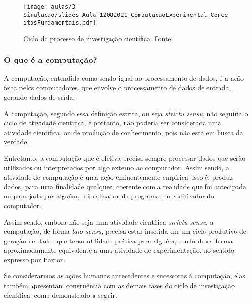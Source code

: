 \begin{figure}
    \centering
    \texttt{[image: aulas/3-Simulacao/slides\_Aula\_12082021\_ComputacaoExperimental\_ConceitosFundamentais.pdf]}
    \caption{Ciclo do processo de investigação científica. Fonte: \cite{barton_graphical_1999}\label{fig:ciclo:barton}}
\end{figure}

\subsubsection{O que é a computação?}
A computação, entendida como sendo igual ao processamento de dados, é a ação feita pelos computadores, que envolve o processamento de dados de entrada, gerando dados de saída.

A computação, segundo essa definição estrita, ou seja \textit{strictu sensu}, não seguiria o ciclo de atividade científica, e portanto, não poderia ser considerada uma atividade científica, ou de produção de conhecimento, pois não está em busca da verdade.

Entretanto, a computação que é efetiva precisa sempre processar dados que serão utilizados ou interpretados por algo externo ao computador.
Assim sendo, a atividade de computação é uma ação eminentemente empírica, isso é, produz dados, para uma finalidade qualquer, coerente com a realidade que foi antecipada ou planejada por alguém, o idealizador do programa e o codificador do computador.

Assim sendo, embora não seja uma atividade científica \textit{strictu sensu}, a computação, de forma \textit{lato sensu}, precisa estar inserida em um ciclo produtivo de geração de dados que terão utilidade prática para alguém, sendo dessa forma aproximadamente equivalente a uma atividade de experimentação, no sentido expresso por Barton.

Se considerarmos as ações humanas  antecedentes e sucessoras à computação, elas também apresentam congruência com as demais fases do ciclo de investigação científica, como demonstrado a seguir.

